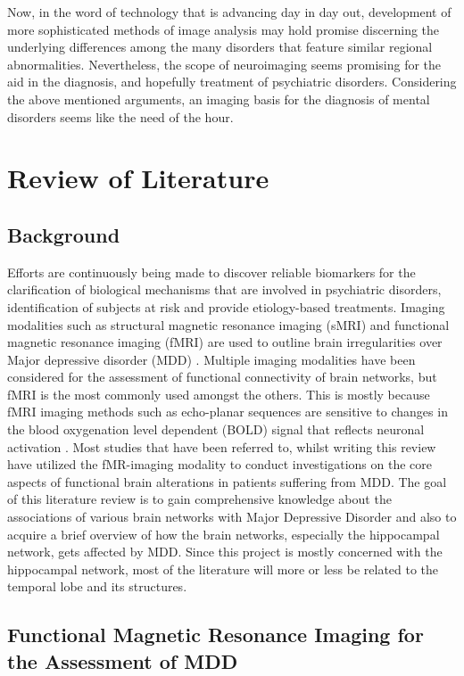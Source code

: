 \documentclass[12pt]{article}
\begin{document}
Now, in the word of technology that is advancing day in day out,
development of more sophisticated methods of image analysis may hold
promise discerning the underlying differences among the many disorders
that feature similar regional abnormalities. Nevertheless, the scope
of neuroimaging seems promising for the aid in the diagnosis, and
hopefully treatment of psychiatric disorders. Considering the above
mentioned arguments, an imaging basis for the diagnosis of mental
disorders seems like the need of the hour.

\newpage
\section{Review of Literature}

\subsection{Background}

Efforts are continuously being made to discover reliable biomarkers
for the clarification of biological mechanisms that are involved in
psychiatric disorders, identification of subjects at risk and provide
etiology-based treatments. Imaging modalities such as structural
magnetic resonance imaging (sMRI) and functional magnetic resonance
imaging (fMRI) are used to outline brain irregularities over Major
depressive disorder (MDD)\cite{structuralbrainimaging}
\cite{fMRIFuture}. Multiple imaging modalities have been considered
for the assessment of functional connectivity of brain networks, but
fMRI is the most commonly used amongst the others. This is mostly
because fMRI imaging methods such as echo-planar sequences are
sensitive to changes in the blood oxygenation level dependent (BOLD)
signal that reflects neuronal activation \cite{rogersassessing}. Most
studies that have been referred to, whilst writing this review have
utilized the fMR-imaging modality to conduct investigations on the
core aspects of functional brain alterations in patients suffering
from MDD. The goal of this literature review is to gain comprehensive
knowledge about the associations of various brain networks with Major
Depressive Disorder and also to acquire a brief overview of how the
brain networks, especially the hippocampal network, gets affected by
MDD. Since this project is mostly concerned with the hippocampal
network, most of the literature will more or less be related to the
temporal lobe and its structures.

\subsection{Functional Magnetic Resonance Imaging for the Assessment
of MDD}
\end{document}
